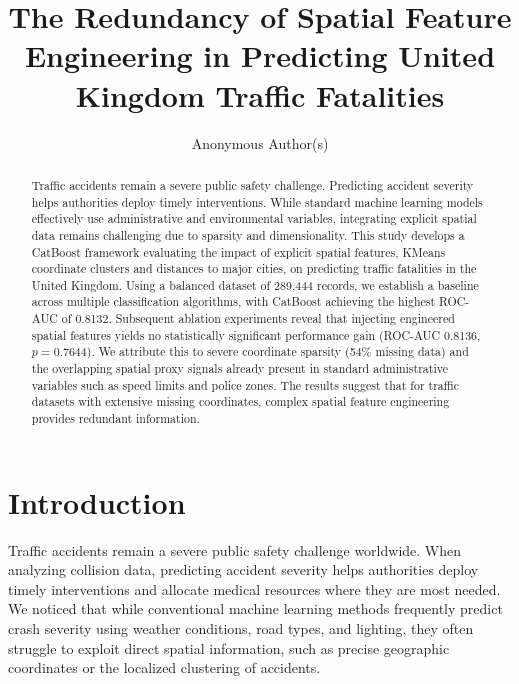 \documentclass[runningheads]{llncs}
\begin{document}
\title{The Redundancy of Spatial Feature Engineering in Predicting United Kingdom Traffic Fatalities}
\author{Anonymous Author(s)}
\maketitle

\begin{abstract}
Traffic accidents remain a severe public safety challenge. Predicting accident severity helps authorities deploy timely interventions. While standard machine learning models effectively use administrative and environmental variables, integrating explicit spatial data remains challenging due to sparsity and dimensionality. This study develops a CatBoost framework evaluating the impact of explicit spatial features, KMeans coordinate clusters and distances to major cities, on predicting traffic fatalities in the United Kingdom. Using a balanced dataset of 289,444 records, we establish a baseline across multiple classification algorithms, with CatBoost achieving the highest ROC-AUC of 0.8132. Subsequent ablation experiments reveal that injecting engineered spatial features yields no statistically significant performance gain (ROC-AUC 0.8136, $p=0.7644$). We attribute this to severe coordinate sparsity (54\% missing data) and the overlapping spatial proxy signals already present in standard administrative variables such as speed limits and police zones. The results suggest that for traffic datasets with extensive missing coordinates, complex spatial feature engineering provides redundant information.
\end{abstract}

\section{Introduction}

Traffic accidents remain a severe public safety challenge worldwide. When analyzing collision data, predicting accident severity helps authorities deploy timely interventions and allocate medical resources where they are most needed. We noticed that while conventional machine learning methods frequently predict crash severity using weather conditions, road types, and lighting, they often struggle to exploit direct spatial information, such as precise geographic coordinates or the localized clustering of accidents.
\end{document}
